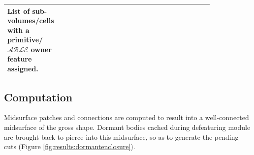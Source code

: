 {\begin{tabular}[h]{@{} p{0.1\linewidth}  p{0.38\linewidth} p{0.15\linewidth} p{0.2\linewidth}@{}}
List of sub-volumes/cells with a primitive/$\mathcal{ABLE}$ owner feature assigned.\\

\bottomrule
\end{tabular}
}
\subsection{Computation} \label{sec:results:computation}

Midsurface patches and connections are computed to result into a well-connected midsurface of the gross shape. Dormant bodies cached during defeaturing module are brought back to pierce into this midsurface, so as to generate the pending cuts (Figure  \ref{fig:results:dormantenclosure}).
\begin{figure}[!h]
\centering     %
{} \qquad

\end{figure}

